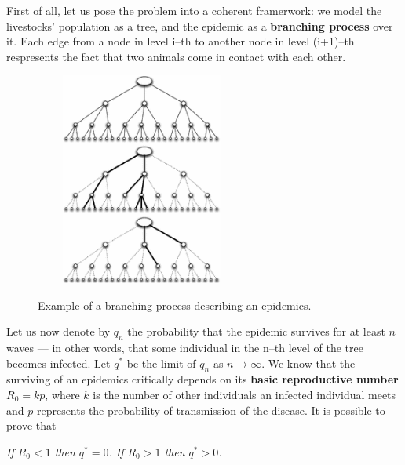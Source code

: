 \documentclass{report}
\theoremstyle{definition}
\theoremstyle{remark}
\begin{document}
First of all, let us pose the problem into a coherent framerwork: we model the livestocks' population as a tree, and the epidemic as a \textbf{branching process} over it. Each edge from a node in level i--th to another node in level (i+1)--th respresents the fact that two animals come in contact with each other.
\begin{figure} [h]
	\centering
	\includegraphics [width=7cm,height=7cm,keepaspectratio]{Branching_giusto.png}
	\label{Bra}
	\caption{Example of a branching process describing an epidemics.}
\end{figure}


 Let us now denote by $q_n$ the probability that the epidemic survives for at least $n$ waves — in other words, that some individual in the n--th level of the tree becomes infected. Let $q^*$ be the limit of $q_n$ as $n \rightarrow \infty$. We know that the surviving of an epidemics critically depends on its \textbf{basic reproductive number} $R_0 = kp$, where $k$ is the number of other individuals an infected individual meets and $p$ represents the probability of transmission of the disease. It is possible to prove that 
\bigskip 

\textit{If $R_0<1$ then $q^* = 0$. If $R_0>1$ then $q^*>0$.}
\bigskip
\end{document}
